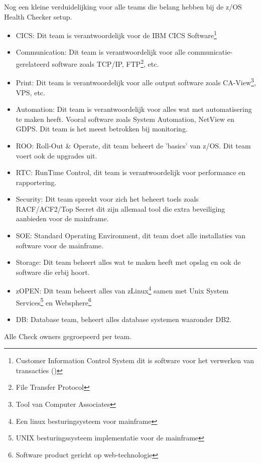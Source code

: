 Nog een kleine verduidelijking voor alle teams die belang hebben bij de z/OS Health Checker setup.
\begin{itemize}
	\item CICS: Dit team is verantwoordelijk voor de IBM CICS Software\footnote{Customer Information Control System dit is software voor het verwerken van transacties (\cite{ChrisRayns2011}) }
	\item Communication: Dit team is verantwoordelijk voor alle communicatie-gerelateerd software zoals TCP/IP, FTP\footnote{File Transfer Protocol}, etc.
	\item Print: Dit team is verantwoordelijk voor alle output software zoals CA-View\footnote{Tool van Computer Associates}, VPS, etc.
	\item Automation: Dit team is verantwoordelijk voor alles wat met automatisering te maken heeft. Vooral software zoals System Automation, NetView en GDPS. Dit team is het meest betrokken bij monitoring.
	\item ROO: Roll-Out \& Operate, dit team beheert de 'basics' van z/OS. Dit team voert ook de upgrades uit.
	\item RTC: RunTime Control, dit team is verantwoordelijk voor performance en rapportering.
	\item Security: Dit team spreekt voor zich het beheert toels zoals RACF/ACF2/Top Secret dit zijn allemaal tool die extra beveiliging aanbieden voor de mainframe.	
	\item SOE: Standard Operating Environment, dit team doet alle installaties van software voor de mainframe.
	\item Storage: Dit team beheert alles wat te maken heeft met opslag en ook de software die erbij hoort.
	\item zOPEN: Dit team beheert alles van zLinux\footnote{Een linux besturingsysteem voor mainframe} samen met Unix System Services\footnote{UNIX besturingssysteem implementatie voor de mainframe} en Websphere\footnote{Software product gericht op web-technologie}
	\item DB: Database team, beheert alles database systemen waaronder DB2.
\end{itemize}

Alle Check owners gegroepeerd per team.

